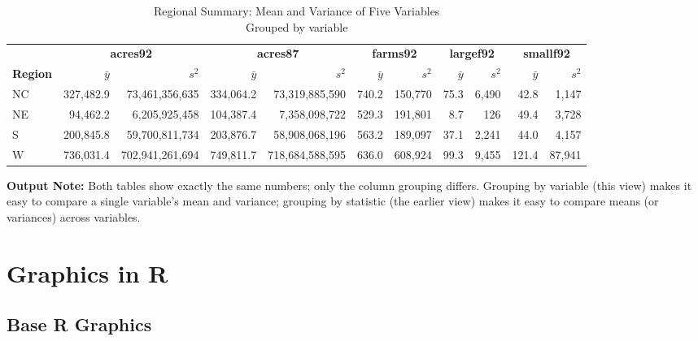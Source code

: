 \documentclass[
  letterpaper,
  DIV=11,
  numbers=noendperiod]{scrreprt}
\renewcommand{\[}{\begin{equation}}
\renewcommand{\]}{\end{equation}}
\begin{document}
\begin{table}
\caption*{
{\fontsize{20}{25}\selectfont  Regional Summary: Mean and Variance of Five Variables\fontsize{12}{15}\selectfont } \\ 
{\fontsize{14}{17}\selectfont  Grouped by variable\fontsize{12}{15}\selectfont }
} 
\fontsize{12.0pt}{14.0pt}\selectfont
\begin{tabular*}{1\linewidth}{@{\extracolsep{\fill}}lrrrrrrrrrr}
\toprule
 & \multicolumn{2}{c}{{\textbf{acres92}}} & \multicolumn{2}{c}{{\textbf{acres87}}} & \multicolumn{2}{c}{{\textbf{farms92}}} & \multicolumn{2}{c}{{\textbf{largef92}}} & \multicolumn{2}{c}{{\textbf{smallf92}}} \\ 
\cmidrule(lr){2-3} \cmidrule(lr){4-5} \cmidrule(lr){6-7} \cmidrule(lr){8-9} \cmidrule(lr){10-11}
\textbf{Region} & \(\bar y\) & \(s^2\) & \(\bar y\) & \(s^2\) & \(\bar y\) & \(s^2\) & \(\bar y\) & \(s^2\) & \(\bar y\) & \(s^2\) \\ 
\midrule\addlinespace[2.5pt]
NC & 327,482.9 & 73,461,356,635 & 334,064.2 & 73,319,885,590 & 740.2 & 150,770 & 75.3 & 6,490 & 42.8 & 1,147 \\ 
NE & 94,462.2 & 6,205,925,458 & 104,387.4 & 7,358,098,722 & 529.3 & 191,801 & 8.7 & 126 & 49.4 & 3,728 \\ 
S & 200,845.8 & 59,700,811,734 & 203,876.7 & 58,908,068,196 & 563.2 & 189,097 & 37.1 & 2,241 & 44.0 & 4,157 \\ 
W & 736,031.4 & 702,941,261,694 & 749,811.7 & 718,684,588,595 & 636.0 & 608,924 & 99.3 & 9,455 & 121.4 & 87,941 \\ 
\bottomrule
\end{tabular*}
\end{table}

\textbf{Output Note:} Both tables show exactly the same numbers; only
the column grouping differs. Grouping by variable (this view) makes it
easy to compare a single variable's mean and variance; grouping by
statistic (the earlier view) makes it easy to compare means (or
variances) across variables.

\section{Graphics in R}\label{graphics-in-r}

\subsection{Base R Graphics}\label{base-r-graphics}
\end{document}
